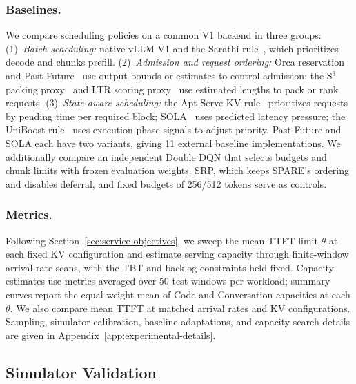 \documentclass[sigconf,anonymous,review]{acmart}
\begin{document}
\subsubsection{Baselines.}
We compare scheduling policies on a common V1 backend in three groups:
(1)~\emph{Batch scheduling:} native vLLM V1 and the Sarathi rule~\cite{intro_sarathi}, which prioritizes decode and chunks prefill.
(2)~\emph{Admission and request ordering:} Orca reservation~\cite{intro_orca} and Past-Future~\cite{intro_pastfuture} use output bounds or estimates to control admission; the S$^3$ packing proxy~\cite{intro_s3} and LTR scoring proxy~\cite{intro_ltr} use estimated lengths to pack or rank requests.
(3)~\emph{State-aware scheduling:} the Apt-Serve KV rule~\cite{intro_aptserve} prioritizes requests by pending time per required block; SOLA~\cite{intro_sola} uses predicted latency pressure; the UniBoost rule~\cite{intro_uniboost} uses execution-phase signals to adjust priority.
Past-Future and SOLA each have two variants, giving 11 external baseline implementations.
We additionally compare an independent Double DQN that selects budgets and chunk limits with frozen evaluation weights.
SRP, which keeps SPARE's ordering and disables deferral, and fixed budgets of 256/512 tokens serve as controls.

\subsubsection{Metrics.}
Following Section~\ref{sec:service-objectives}, we sweep the mean-TTFT limit $\theta$ at each fixed KV configuration and estimate serving capacity through finite-window arrival-rate scans, with the TBT and backlog constraints held fixed.
Capacity estimates use metrics averaged over 50 test windows per workload; summary curves report the equal-weight mean of Code and Conversation capacities at each $\theta$.
We also compare mean TTFT at matched arrival rates and KV configurations.
Sampling, simulator calibration, baseline adaptations, and capacity-search details are given in Appendix~\ref{app:experimental-details}.


\subsection{Simulator Validation}
\label{sec:simulator-validation}
\end{document}
